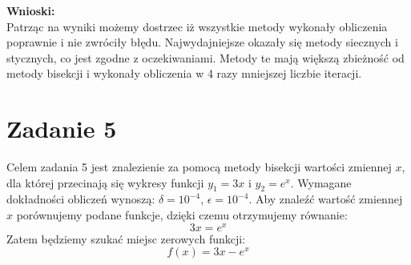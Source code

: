 \documentclass[12pt]{article}
\begin{document}
\noindent \textbf{Wnioski:}\\
Patrząc na wyniki możemy dostrzec iż wszystkie metody wykonały obliczenia poprawnie i nie zwróciły błędu. Najwydajniejsze okazały się metody siecznych i stycznych, co jest zgodne z oczekiwaniami. Metody te mają większą zbieżność od metody bisekcji i wykonały obliczenia w 4 razy mniejszej liczbie iteracji.



\section{Zadanie 5}
Celem zadania 5 jest znalezienie za pomocą metody bisekcji wartości zmiennej $x$, dla której przecinają się wykresy funkcji $y_1=3x$ i $y_2=e^x$. Wymagane dokładności obliczeń wynoszą: $\delta=10^{-4}$, $\epsilon=10^{-4}$.
Aby znaleźć wartość zmiennej $x$ porównujemy podane funkcje, dzięki czemu otrzymujemy równanie:
\begin{equation*}
3x=e^x
\end{equation*}
Zatem będziemy szukać miejsc zerowych funkcji:
\begin{equation*}
f(x)=3x-e^x
\end{equation*}
\end{document}
